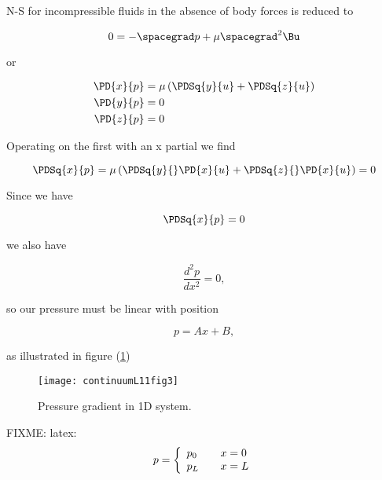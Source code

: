 N-S for incompressible fluids in the absence of body forces is reduced to

\begin{equation}\label{eqn:continuumL11:310}
0 = - \spacegrad p + \mu \spacegrad^2 \Bu 
\end{equation}

or

\begin{align}\label{eqn:continuumL11:330}
\PD{x}{p} &= \mu \left( \PDSq{y}{u} + \PDSq{z}{u} \right) \\
\PD{y}{p} &= 0 \\
\PD{z}{p} &= 0 
\end{align}

Operating on the first with an x partial we find

\begin{equation}\label{eqn:continuumL11:350}
\PDSq{x}{p} = \mu \left( \PDSq{y}{} \PD{x}{u} + \PDSq{z}{}\PD{x}{u} \right) = 0
\end{equation}

Since we have

\begin{equation}\label{eqn:continuumL11:370}
\PDSq{x}{p} = 0
\end{equation}

we also have

\begin{equation}\label{eqn:continuumL11:390}
\frac{d^2 p}{dx^2} = 0,
\end{equation}

so our pressure must be linear with position

\begin{equation}\label{eqn:continuumL11:410}
p = A x + B,
\end{equation}

as illustrated in figure (\ref{fig:continuumL11:continuumL11fig3})
\begin{figure}[htp]
   \centering
   \texttt{[image: continuumL11fig3]}
   \caption{Pressure gradient in 1D system.}\label{fig:continuumL11:continuumL11fig3}
\end{figure}

FIXME: latex:
\begin{equation}\label{eqn:continuumL11:430}
p =
\left\{
\begin{array}{l l}
p_0 & \quad \mbox{$x = 0$} \\
p_L & \quad \mbox{$x = L$} 
\end{array}
\right.
\end{equation}

